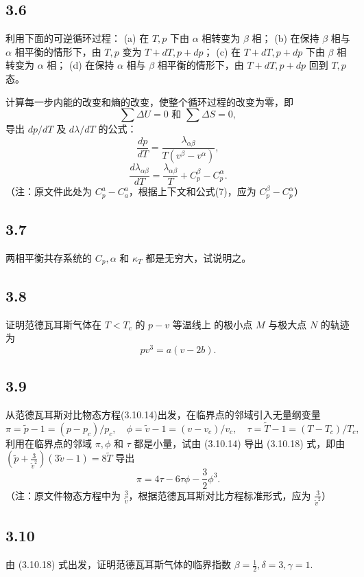 \newpage
\subsection{3.6}
利用下面的可逆循环过程：
(a) 在 $T, p$ 下由 $\alpha$ 相转变为 $\beta$ 相；
(b) 在保持 $\beta$ 相与 $\alpha$ 相平衡的情形下，由 $T, p$ 变为 $T + dT, p + dp$；
(c) 在 $T + dT, p + dp$ 下由 $\beta$ 相转变为 $\alpha$ 相；
(d) 在保持 $\alpha$ 相与 $\beta$ 相平衡的情形下，由 $T + dT, p + dp$ 回到 $T, p$ 态。

计算每一步内能的改变和熵的改变，使整个循环过程的改变为零，即
$$\sum \Delta U = 0 \text{ 和 } \sum \Delta S = 0,$$
导出 $dp/dT$ 及 $d\lambda/dT$ 的公式：
$$\frac{dp}{dT} = \frac{\lambda_{\alpha\beta}}{T(v^{\beta} - v^{\alpha})},$$
$$\frac{d\lambda_{\alpha\beta}}{dT} = \frac{\lambda_{\alpha\beta}}{T} + C_p^{\beta} - C_p^{\alpha}.$$
（注：原文件此处为 $C_p^a - C_a^a$，根据上下文和公式(7)，应为 $C_p^{\beta} - C_p^{\alpha}$）

\newpage
\subsection{3.7}
两相平衡共存系统的 $C_p, \alpha$ 和 $\kappa_T$ 都是无穷大，试说明之。

\newpage
\subsection{3.8}
证明范德瓦耳斯气体在 $T<T_c$ 的 $p-v$ 等温线上 的极小点 $M$ 与极大点 $N$ 的轨迹为
$$pv^3 = a(v-2b).$$

\newpage
\subsection{3.9}
从范德瓦耳斯对比物态方程(3.10.14)出发，在临界点的邻域引入无量纲变量
$$\pi=\tilde{p}-1=(p-p_c)/p_c, \quad \phi=\tilde{v}-1=(v-v_c)/v_c, \quad \tau=\tilde{T}-1=(T-T_c)/T_c,$$
利用在临界点的邻域 $\pi, \phi$ 和 $\tau$ 都是小量，试由 (3.10.14) 导出 (3.10.18) 式，即由 $\left( \tilde{p} + \frac{3}{\tilde{v}^2} \right)(3\tilde{v}-1)=8\tilde{T}$ 导出
$$\pi = 4\tau - 6\tau\phi - \frac{3}{2}\phi^3.$$
（注：原文件物态方程中为 $\frac{3}{\tilde{v}}$，根据范德瓦耳斯对比方程标准形式，应为 $\frac{3}{\tilde{v}^2}$）

\newpage
\subsection{3.10}
由 (3.10.18) 式出发，证明范德瓦耳斯气体的临界指数 $\beta = \frac{1}{2}, \delta = 3, \gamma = 1$.